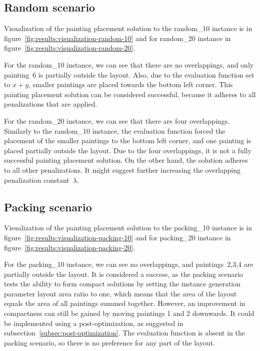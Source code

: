 \newpage

\subsection{Random scenario}\label{subsec:random-scenario}

Visualization of the painting placement solution to the random\_10 instance
is in figure~\ref{fig:results:visualization-random-10}
and for random\_20 instance in figure~\ref{fig:results:visualization-random-20}.

For the random\_10 instance, we can see that there are no overlappings, and only painting~6 is partially outside the layout.
Also, due to the evaluation function set to $x+y$, smaller paintings
are placed towards the bottom left corner.
This painting placement solution can be considered successful,
because it adheres to all penalizations that are applied.

For the random\_20 instance, we can see that there are four overlappings.
Similarly to the random\_10 instance, the evaluation function forced the placement of the
smaller paintings to the bottom left corner, and one painting is placed partially outside the layout.
Due to the four overlappings, it is not a fully successful painting placement solution.
On the other hand, the solution adheres to all other penalizations.
It might suggest further increasing the overlapping penalization constant~$\lambda$.

\subsection{Packing scenario}\label{subsec:packing-scenario}
Visualization of the painting placement solution to the packing\_10 instance
is in figure~\ref{fig:results:visualization-packing-10}
and for packing\_20 instance in figure~\ref{fig:results:visualization-packing-20}.

For the packing\_10 instance, we can see no overlappings, and paintings~2,3,4 are partially outside the layout.
It is considered a success, as the packing scenario tests the ability to form compact solutions by setting the instance generation parameter
layout area ratio to one, which means that the area of the layout equals the area of all paintings summed together.
However, an improvement in compactness can still be gained by moving paintings 1 and 2 downwards.
It could be implemented using a post-optimization, as suggested in subsection~\ref{subsec:post-optimization}.
The evaluation function is absent in the packing scenario, so there is no preference for any part of the layout.

